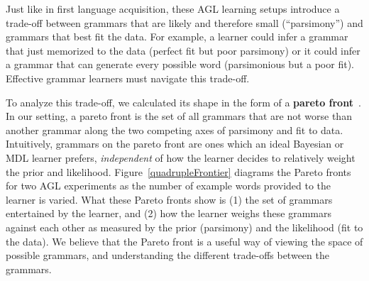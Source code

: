 \documentclass{article}
\begin{document}
Just like in first language acquisition,
these AGL learning setups introduce a trade-off between
grammars that are likely and therefore small (``parsimony'')  and grammars that
best fit the data.
For example, a learner could infer a grammar that just memorized to the data (perfect fit but poor parsimony)
or it could infer a grammar that can generate every
possible word (parsimonious but a poor fit).
Effective grammar learners must navigate this trade-off.

To analyze this trade-off, we calculated its shape in the form of a
\textbf{pareto front}~\cite{mattson2005pareto}.
In our setting, a pareto front is the set of all grammars that
are not worse than another grammar along
the two competing axes of parsimony and fit to data.
Intuitively, grammars on the pareto front
are ones which an ideal Bayesian or MDL learner prefers,
\emph{independent} of how the learner decides to
relatively weight the prior and likelihood.
Figure~\ref{quadrupleFrontier}
diagrams the Pareto fronts for two AGL experiments
as the number of
example words provided to the learner is varied.
What these Pareto fronts show is (1)
the set of grammars entertained by the learner,
and (2) how the learner weighs these grammars against each other
as measured by the prior (parsimony) and the likelihood (fit to the data).
We believe that the Pareto front is a useful way of
viewing the space of possible grammars,
and understanding the different trade-offs
between the grammars.
\end{document}
